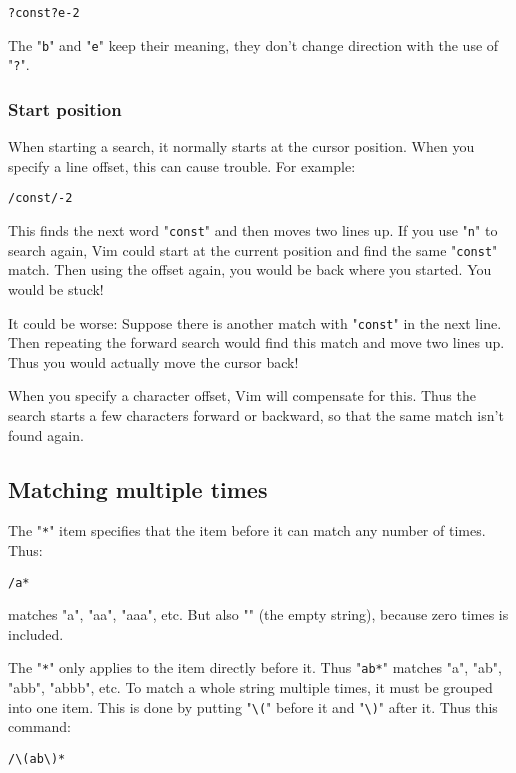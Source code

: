 \begin{Verbatim}[samepage=true]
 ?const?e-2
\end{Verbatim}

The "\texttt{b}" and "\texttt{e}" keep their meaning, they don't change direction with the use of "\texttt{?}".
\subsubsection{Start position}
When starting a search, it normally starts at the cursor position.
When you specify a line offset, this can cause trouble.
For example:

\begin{Verbatim}[samepage=true]
 /const/-2
\end{Verbatim}

This finds the next word "\texttt{const}" and then moves two lines up.
If you use "\texttt{n}" to search again, Vim could start at the current position and find the same "\texttt{const}" match.
Then using the offset again, you would be back where you started.
You would be stuck!

It could be worse: Suppose there is another match with "\texttt{const}" in the next line.
Then repeating the forward search would find this match and move two lines up.
Thus you would actually move the cursor back!

When you specify a character offset, Vim will compensate for this.
Thus the search starts a few characters forward or backward, so that the same match isn't found again.
\subsection{Matching multiple times}
The "\texttt{*}" item specifies that the item before it can match any number of times.
Thus:

\begin{Verbatim}[samepage=true]
 /a*
\end{Verbatim}

matches "a", "aa", "aaa", etc.
But also "" (the empty string), because zero times is included.

The "\texttt{*}" only applies to the item directly before it.
Thus "\texttt{ab*}" matches "a", "ab", "abb", "abbb", etc.
To match a whole string multiple times, it must be grouped into one item.
This is done by putting "\texttt{\textbackslash{}(}" before it and "\texttt{\textbackslash{})}" after it.
Thus this command:

\begin{Verbatim}[samepage=true]
 /\(ab\)*
\end{Verbatim}

